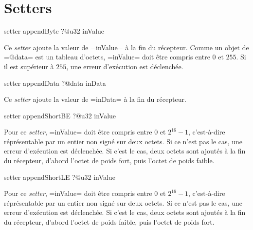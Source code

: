 \section{Setters}



\begin{galgas4}
setter appendByte ?@u32 inValue
\end{galgas4}

Ce \emph{setter} ajoute la valeur de \ggsq=inValue= à la fin du récepteur. Comme un objet de \ggsq=@data= est un tableau d'octets, \ggsq=inValue= doit être compris entre $0$ et $255$. Si il est supérieur à $255$, une erreur d'exécution est déclenchée.




\begin{galgas4}
setter appendData ?@data inData
\end{galgas4}

Ce \emph{setter} ajoute la valeur de \ggsq=inData= à la fin du récepteur.






\begin{galgas4}
setter appendShortBE ?@u32 inValue
\end{galgas4}

Pour ce \emph{setter}, \ggsq=inValue= doit être compris entre $0$ et $2^{16}-1$, c'est-à-dire réprésentable par un entier non signé sur deux octets. Si ce n'est pas le cas, une erreur d'exécution est déclenchée. Si c'est le cas, deux octets sont ajoutés à la fin du récepteur, d'abord l'octet de poids fort, puis l'octet de poids faible.








\begin{galgas4}
setter appendShortLE ?@u32 inValue
\end{galgas4}

Pour ce \emph{setter}, \ggsq=inValue= doit être compris entre $0$ et $2^{16}-1$, c'est-à-dire réprésentable par un entier non signé sur deux octets. Si ce n'est pas le cas, une erreur d'exécution est déclenchée. Si c'est le cas, deux octets sont ajoutés à la fin du récepteur, d'abord l'octet de poids faible, puis l'octet de poids fort.









